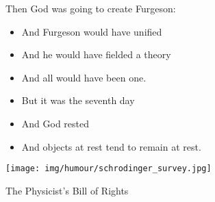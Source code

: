 Then God was going to create Furgeson:
\begin{itemize}
	\item And Furgeson would have unified
	\item And he would have fielded a theory
	\item And all would have been one.
	\item But it was the seventh day
	\item And God rested
	\item And objects at rest tend to remain at rest.
\end{itemize}
\begin{center}\underline{\hspace{5 cm}}\end{center}

	\begin{center}
		\texttt{[image: img/humour/schrodinger\_survey.jpg]}	
	\end{center}

\begin{center}\underline{\hspace{5 cm}}\end{center}
The Physicist's Bill of Rights

